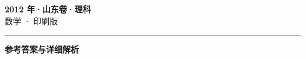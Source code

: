 \documentclass[zihao=5, a4paper]{ctexart}
\begin{document}
\begin{center}
  {\Large\bfseries 2012 年·山东卷·理科}\\[4pt]
  {\large 数学 · 印刷版}
\end{center}
\medskip
{}

\par\bigskip\hrule\bigskip
{}
\Needspace{0.55\textheight}
\begin{center}{\large\bfseries 参考答案与详细解析}\end{center}
\smallskip

\end{document}
